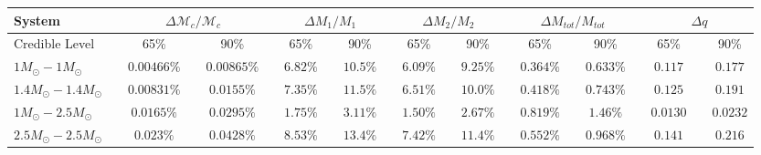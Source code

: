 \documentclass[11pt,a4paper]{emulateapj} 
\newcommand{\chmass}{\mathcal{M}_c}
\begin{document}
\begin{table}[t!]
{\begin{tabular}{lcccccccccccccccccccc}
 \hline\hline System & \vline & \multicolumn{3}{c}{$\Delta \chmass / \chmass$} &
\vline & \multicolumn{3}{c}{$\Delta M_1 / M_1$} & \vline & \multicolumn{3}{c}{$\Delta M_2 / M_2$} & \vline &
\multicolumn{3}{c}{$\Delta M_{tot}/M_{tot}$} & \vline & \multicolumn{3}{c}{$\Delta q$}\\ \hline
Credible Level & \vline & 65\% & \vline & 90\% & \vline & 65\% & \vline & 90\% & \vline & 65\% & \vline & 90\% & \vline & 65\% & \vline & 90\% & \vline & 65\% & \vline & 90\% \\
\hline\hline

$1M_{\odot}-1M_{\odot}$ & \vline &$0.00466\%$ & \vline &$0.00865\%$ & \vline & $6.82\%$ & \vline &$10.5\%$ & \vline & $6.09\%$ & \vline &$9.25\%$ & \vline & $0.364\%$ & \vline &$0.633\%$ & \vline & $0.117$ & \vline &$0.177$\\\hline$1.4M_{\odot}-1.4M_{\odot}$ & \vline &$0.00831\%$ & \vline &$0.0155\%$ & \vline & $7.35\%$ & \vline &$11.5\%$ & \vline & $6.51\%$ & \vline &$10.0\%$ & \vline & $0.418\%$ & \vline &$0.743\%$ & \vline & $0.125$ & \vline &$0.191$\\\hline$1M_{\odot}-2.5M_{\odot}$ & \vline &$0.0165\%$ & \vline &$0.0295\%$ & \vline & $1.75\%$ & \vline &$3.11\%$ & \vline & $1.50\%$ & \vline &$2.67\%$ & \vline & $0.819\%$ & \vline &$1.46\%$ & \vline & $0.0130$ & \vline &$0.0232$\\\hline$2.5M_{\odot}-2.5M_{\odot}$ & \vline &$0.023\%$ & \vline &$0.0428\%$ & \vline & $8.53\%$ & \vline &$13.4\%$ & \vline & $7.42\%$ & \vline &$11.4\%$ & \vline & $0.552\%$ & \vline &$0.968\%$ & \vline & $0.141$ & \vline &$0.216$\\

\hline
\hline


\end{tabular}}
\label{ciTableIntrinsic}
\end{table}
\end{document}
